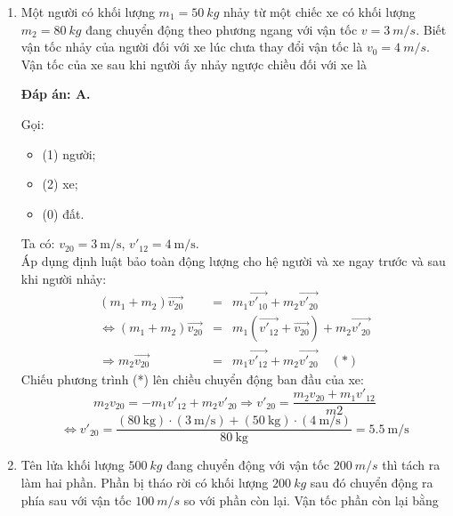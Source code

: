 \begin{enumerate}[label=\bfseries Câu \arabic*:, leftmargin=1.5cm]
	\item {}
	
	
	{Một người có khối lượng $m_1=\SI{50}{kg}$ nhảy từ một chiếc xe có khối lượng $m_2 = \SI{80}{kg}$ đang chuyển động theo phương ngang với vận tốc $v = \SI{3}{m/s}$. Biết vận tốc nhảy của người đối với xe lúc chưa thay đổi vận tốc là $v_0 = \SI{4}{m/s}$. Vận tốc của xe sau khi người ấy nhảy ngược chiều đối với xe là
	}
	
	\hideall
	{	
		\textbf{Đáp án: A.}
		
		Gọi:
		\begin{itemize}
			\item (1) người;
			\item (2) xe;
			\item (0) đất.
		\end{itemize}
		Ta có: $v_{20}=\SI{3}{\meter/\second}$, $v'_{12}=\SI{4}{\meter/\second}$.\\
		Áp dụng định luật bảo toàn động lượng cho hệ người và xe ngay trước và sau khi người nhảy:
		\begin{eqnarray*}
			\left(m_1+m_2\right)\overrightarrow{v_{20}}&=&m_1\overrightarrow{v'_{10}} +m_2\overrightarrow{v'_{20}}\\
			\Leftrightarrow \left(m_1+m_2\right)\overrightarrow{v_{20}}&=&m_1\left(\overrightarrow{v'_{12}}+\overrightarrow{v_{20}}\right) +m_2\overrightarrow{v'_{20}}\\
			\Rightarrow m_2\overrightarrow{v_{20}}&=&m_1\overrightarrow{v'_{12}}+m_2\overrightarrow{v'_{20}} \quad (*)
		\end{eqnarray*}		
		Chiếu phương trình (*) lên chiều chuyển động ban đầu của xe:
		$$m_2v_{20}=-m_1v'_{12}+m_2v'_{20}\Rightarrow v'_{20}=\dfrac{m_2v_{20}+m_1v'_{12}}{m2}$$
		$$\Leftrightarrow v'_{20}=\dfrac{\left(\SI{80}{\kilogram}\right)\cdot\left(\SI{3}{\meter/\second}\right)+\left(\SI{50}{\kilogram}\right)\cdot\left(\SI{4}{\meter/\second}\right)}{\SI{80}{\kilogram}}=\SI{5.5}{\meter/\second}$$
		
		
	}
	\item {}
	
	
	{Tên lửa khối lượng $\SI{500}{kg}$ đang chuyển động với vận tốc  $\SI{200}{m/s}$ thì tách ra làm hai phần. Phần bị tháo rời có khối lượng $\SI{200}{kg}$ sau đó chuyển động ra phía sau với vận tốc $\SI{100}{m/s}$ so với phần còn lại. Vận tốc phần còn lại bằng
	}
	

\end{enumerate}
